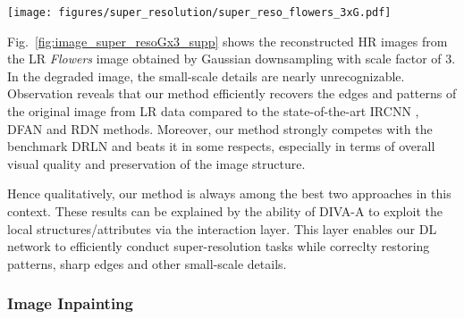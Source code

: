 \documentclass[10pt,journal,compsoc]{IEEEtran}
\begin{document}
\begin{figure*}[t!]
\begin{centering}
\texttt{[image: figures/super\_resolution/super\_reso\_flowers\_3xG.pdf]}
\end{centering}

\caption{Restored HR \textit{Flowers} images from LR images generated by Gaussian downsampling under a $7 \times 7$ Gaussian blur kernel of standard deviation 1.6 with scaling factor 3.}
\label{fig:image_super_resoGx3_supp}

\end{figure*}







Fig.~\ref{fig:image_super_resoGx3_supp} shows the reconstructed HR images from the LR \textit{Flowers} image obtained by Gaussian downsampling with scale factor of 3. In the degraded image, the small-scale details are nearly unrecognizable. Observation reveals that our method efficiently recovers the edges and patterns of the original image from LR data compared to the state-of-the-art IRCNN \cite{Zhang2017learning}, DFAN \cite{Li2022DFAN} and RDN \cite{Zhang2021residual} methods. Moreover, our method strongly competes with the benchmark DRLN \cite{Anwar2022densely} and beats it in some respects, especially in terms of overall visual quality and preservation of the image structure.



Hence qualitatively, our method is always among the best two approaches in this context. These results can be explained by the ability of DIVA-A to exploit the local structures/attributes via the interaction layer. This layer enables our DL network to efficiently conduct super-resolution tasks while correclty restoring patterns, sharp edges and other small-scale details.








\subsubsection{Image Inpainting}
\label{sec:result_inpaint_supp}
\end{document}
